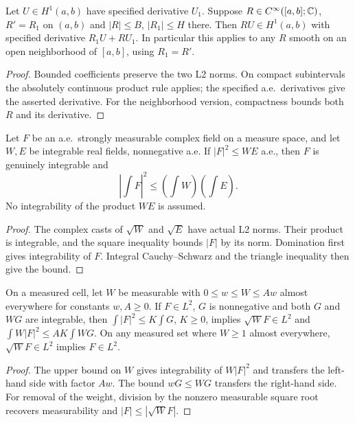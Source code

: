 \begin{lemma}
\label{lem:h1-smooth-multiplier}
\leanok
Let $U\in H^1(a,b)$ have specified derivative $U_1$. Suppose
$R\in C^\infty([a,b];\mathbb{C})$, $R'=R_1$ on $(a,b)$ and
$|R|\le B$, $|R_1|\le H$ there. Then $RU\in H^1(a,b)$ with
specified derivative $R_1U+RU_1$. In particular this applies to any $R$
smooth on an open neighborhood of $[a,b]$, using $R_1=R'$.
\end{lemma}

\begin{proof}
\leanok
Bounded coefficients preserve the two L2 norms.
On compact subintervals the absolutely continuous product rule applies;
the specified a.e.\ derivatives give the asserted derivative.
For the neighborhood version, compactness bounds both $R$ and its derivative.
\end{proof}

\begin{lemma}
\label{lem:square-density-cauchy-schwarz}
\leanok
Let $F$ be an a.e.\ strongly measurable complex field on a measure space,
and let $W,E$ be integrable real fields, nonnegative a.e.
If $|F|^2\le WE$ a.e., then $F$ is genuinely integrable and
\[
 \left|\int F\right|^2\le\left(\int W\right)\left(\int E\right).
\]
No integrability of the product $WE$ is assumed.
\end{lemma}

\begin{proof}
\leanok
The complex casts of $\sqrt W$ and $\sqrt E$ have actual L2 norms.
Their product is integrable, and the square inequality bounds $|F|$
by its norm. Domination first gives integrability of $F$.
Integral Cauchy--Schwarz and the triangle inequality then give the bound.
\end{proof}

\begin{lemma}
\label{lem:cell-weight-transfer}
\leanok
On a measured cell, let $W$ be measurable with $0\le w\le W\le Aw$ almost
everywhere for constants $w,A\ge0$. If $F\in L^2$, $G$ is nonnegative and
both $G$ and $WG$ are integrable, then
$\int|F|^2\le K\int G$, $K\ge0$, implies $\sqrt W F\in L^2$ and
$\int W|F|^2\le AK\int WG$. On any measured set where $W\ge1$ almost
everywhere, $\sqrt W F\in L^2$ implies $F\in L^2$.
\end{lemma}
\begin{proof}
\leanok
The upper bound on $W$ gives integrability of $W|F|^2$ and transfers the
left-hand side with factor $Aw$. The bound $wG\le WG$ transfers the
right-hand side. For removal of the weight, division by the nonzero
measurable square root recovers measurability and $|F|\le|\sqrt W F|$.
\end{proof}

